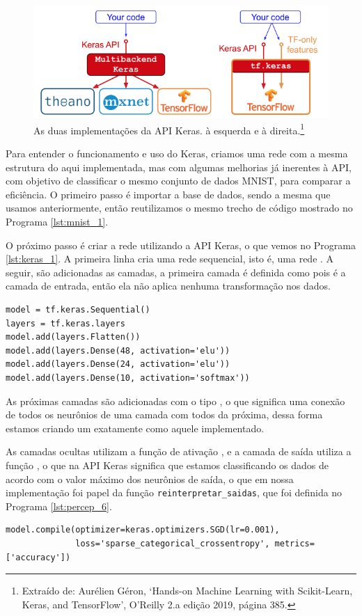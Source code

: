 \begin{figure}[htb]
\centering
\includegraphics[width=12cm]{figuras/tensor_flow}
\caption{As duas implementações da API Keras.  à esquerda e  à direita.\footnote{Extraído de: Aurélien Géron, `Hands-on Machine Learning with Scikit-Learn, Keras, and TensorFlow', O'Reilly 2.a edição 2019, página 385.}}
\label{fig:tensor_flow}
\end{figure}

Para entender o funcionamento e uso do Keras, criamos uma rede com a mesma estrutura do  aqui implementada, mas com algumas melhorias já inerentes à API, com objetivo de classificar o mesmo conjunto de dados MNIST, para comparar a eficiência. O primeiro passo é importar a base de dados, sendo a mesma que usamos anteriormente, então reutilizamos o mesmo trecho de código mostrado no Programa \ref{lst:mnist_1}.

O próximo passo é criar a rede utilizando a API Keras, o que vemos no Programa \ref{lst:keras_1}. A primeira linha cria uma rede sequencial, isto é, uma rede . A seguir, são adicionadas as camadas, a primeira camada é definida como  pois é a camada de entrada, então ela não aplica nenhuma transformação nos dados.
\newline
\estiloR
\begin{lstlisting}[caption={Trecho do script \eng{mnist\_keras.py}},label={lst:keras_1},escapeinside={\%}]
model = tf.keras.Sequential()
layers = tf.keras.layers
model.add(layers.Flatten())
model.add(layers.Dense(48, activation='elu'))
model.add(layers.Dense(24, activation='elu'))
model.add(layers.Dense(10, activation='softmax'))
\end{lstlisting}


As próximas camadas são adicionadas com o tipo , o que significa uma conexão de todos os neurônios de uma camada com todos da próxima, dessa forma estamos criando um  exatamente como aquele implementado. 

As camadas ocultas utilizam a função de ativação , e a camada de saída utiliza a função , o que na API Keras significa que estamos classificando os dados de acordo com o valor máximo dos neurônios de saída, o que em nossa implementação foi papel da função \texttt{reinterpretar\_saidas}, que foi definida no Programa \ref{lst:percep_6}.
\newpage
\estiloR
\begin{lstlisting}[caption={Trecho do script \eng{mnist\_keras.py}},label={lst:keras_2},escapeinside={\%}]
model.compile(optimizer=keras.optimizers.SGD(lr=0.001),
              loss='sparse_categorical_crossentropy', metrics=['accuracy'])
\end{lstlisting}

